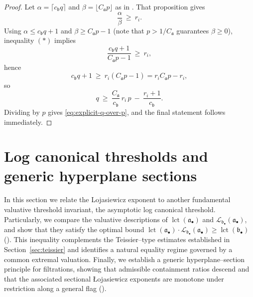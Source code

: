 \documentclass[12pt]{amsart}
\renewcommand{\a}{\mathfrak{a}}
\renewcommand{\b}{\mathfrak{b}}
\newcommand{\lct}{\operatorname{\mathrm{lct}}}
\newcommand{\Loj}{\mathcal{L}} %
\newcommand{\abul}{{\a_\bullet}}
\newcommand{\bbul}{{\b_\bullet}}
\theoremstyle{plain}
\theoremstyle{definition}
\numberwithin{equation}{section}
\begin{document}
\begin{proof}
Let $\alpha=\lceil c_\b q\rceil$ and $\beta=\lfloor C_\a p\rfloor$ as in
.  That proposition gives
\[
\frac{\alpha}{\beta}\ \ge\ r_i.
\tag{$\ast$}
\]
Using $\alpha\le c_\b q+1$ and $\beta\ge C_\a p-1$ (note that $p > 1/C_\a$ guarantees $\beta\ge 0$),
inequality $(\ast)$ implies
\[
\frac{c_\b q+1}{C_\a p-1}\ \ge\ r_i,
\]
hence
\[
c_\b q+1\ \ge\ r_i(C_\a p-1)=r_i C_\a p-r_i,
\]
so
\[
q\ \ge\ \frac{C_\a}{c_\b}\,r_i\,p\ -\ \frac{r_i+1}{c_\b}.
\]
Dividing by $p$ gives \eqref{eq:explicit-q-over-p}, and the final statement follows immediately.
\end{proof}



\section{Log canonical thresholds and generic hyperplane sections}\label{sec:lct-rigidity}

In this section we relate the Lojasiewicz exponent to another fundamental valuative threshold
invariant, the asymptotic log canonical threshold. Particularly, we compare the valuative descriptions of
$\lct(\abul)$ and $\Loj_{\bbul}(\abul)$, and show that they satisfy the optimal bound $\lct(\abul) \cdot \Loj_{\bbul}(\abul) \ge \lct(\bbul)$ (). This inequality complements the Teissier--type estimates established in Section~\ref{sec:teissier} and identifies a natural equality regime governed by a common extremal valuation.
Finally, we establish a generic hyperplane--section principle for filtrations, showing that admissible containment ratios descend and that the associated sectional \L{}ojasiewicz exponents are monotone under restriction along a general flag ().


\end{document}
